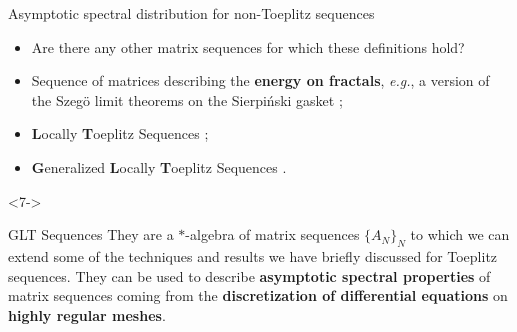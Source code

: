 \documentclass[aspectratio=169,xcolor=dvipsnames]{beamer}
\begin{document}
\begin{frame}{\Large Asymptotic spectral distribution for non-Toeplitz sequences}
{\begin{itemize}
	\item[\faQuestionCircle] Are there any other matrix sequences for which these definitions hold?
	\item[1.]<4-> Sequence of matrices describing the \textbf{energy on fractals}, \textit{e.g.}, a version of the Szeg\"{o} limit theorems on the {S}ierpi\'{n}ski gasket \parencite{MR2643590};
	\item[2.]<5-> \textbf{L}ocally \textbf{T}oeplitz Sequences \parencite{MR1637331};
	\item[3.]<6-> \textbf{G}eneralized \textbf{L}ocally \textbf{T}oeplitz Sequences \parencite{MR3674485,MR3887576}.
\end{itemize}
}
\begin{onlyenv}<7->
\begin{exampleblock}{GLT Sequences}
They are a \alert{$*$-algebra of matrix sequences} $\{A_N\}_N$ to which we can extend some of the techniques and results we have briefly discussed for Toeplitz sequences. They can be used to describe \textbf{asymptotic spectral properties} of matrix sequences coming from the \textbf{discretization of differential equations} on \textbf{highly regular meshes}. 
\end{exampleblock}
\end{onlyenv}

\end{frame}
\end{document}
